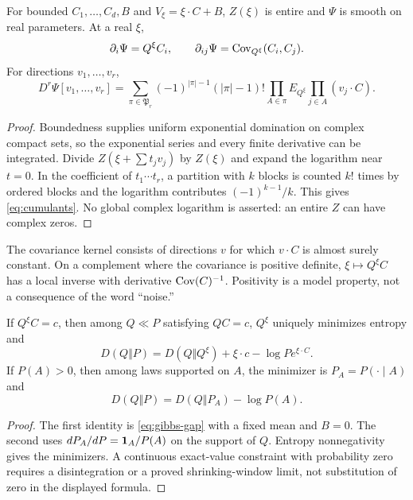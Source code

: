 \begin{proposition}\label{prop:cumulants}
For bounded $C_1,\ldots,C_d,B$ and $V_\xi=\xi\cdot C+B$, $Z(\xi)$ is entire and $\Psi$ is smooth on real parameters. At a real $\xi$,
\[
 \partial_i\Psi=Q^\xi C_i,\qquad \partial_{ij}\Psi=\operatorname{Cov}_{Q^\xi}(C_i,C_j).
\]
For directions $v_1,\ldots,v_r$,
\begin{equation}
 D^r\Psi[v_1,\ldots,v_r]
 =\sum_{\pi\in\mathfrak P_r}(-1)^{|\pi|-1}(|\pi|-1)!
 \prod_{A\in\pi}E_{Q^\xi}\prod_{j\in A}(v_j\cdot C).
 \label{eq:cumulants}
\end{equation}
\end{proposition}
\begin{proof}
Boundedness supplies uniform exponential domination on complex compact sets, so the exponential series and every finite derivative can be integrated. Divide $Z(\xi+\sum t_jv_j)$ by $Z(\xi)$ and expand the logarithm near $t=0$. In the coefficient of $t_1\cdots t_r$, a partition with $k$ blocks is counted $k!$ times by ordered blocks and the logarithm contributes $(-1)^{k-1}/k$. This gives \eqref{eq:cumulants}. No global complex logarithm is asserted: an entire $Z$ can have complex zeros.
\end{proof}

The covariance kernel consists of directions $v$ for which $v\cdot C$ is almost surely constant. On a complement where the covariance is positive definite, $\xi\mapsto Q^\xi C$ has a local inverse with derivative $\operatorname{Cov}(C)^{-1}$. Positivity is a model property, not a consequence of the word ``noise.''

\begin{proposition}\label{prop:constraints}
If $Q^\xi C=c$, then among $Q\ll P$ satisfying $QC=c$, $Q^\xi$ uniquely minimizes entropy and
\[
 D(Q\Vert P)=D(Q\Vert Q^\xi)+\xi\cdot c-\log Pe^{\xi\cdot C}.
\]
If $P(A)>0$, then among laws supported on $A$, the minimizer is $P_A=P(\cdot\mid A)$ and
\[
 D(Q\Vert P)=D(Q\Vert P_A)-\log P(A).
\]
\end{proposition}
\begin{proof}
The first identity is \eqref{eq:gibbs-gap} with a fixed mean and $B=0$. The second uses $dP_A/dP=\mathbf 1_A/P(A)$ on the support of $Q$. Entropy nonnegativity gives the minimizers. A continuous exact-value constraint with probability zero requires a disintegration or a proved shrinking-window limit, not substitution of zero in the displayed formula.
\end{proof}

